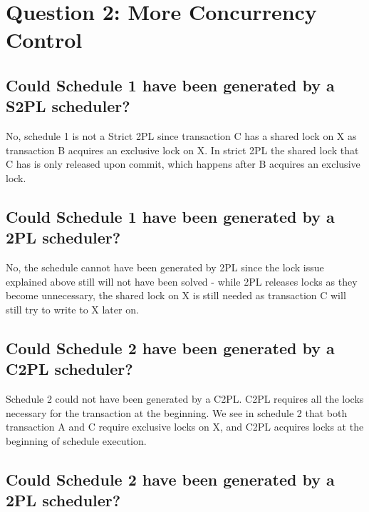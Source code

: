 \documentclass{article}
\begin{document}
\section{Question 2: More Concurrency Control}
\subsection{Could Schedule 1 have been generated by a S2PL scheduler?}
No, schedule 1 is not a Strict 2PL since transaction C has a shared lock on X as transaction B acquires an exclusive lock on X. In strict 2PL the shared lock that C has is only released upon commit, which happens after B acquires an exclusive lock.

\subsection{Could Schedule 1 have been generated by a 2PL scheduler?}

No, the schedule cannot have been generated by 2PL since the lock issue explained above still will not have been solved - while 2PL releases locks as they become unnecessary, the shared lock on X is still needed as transaction C will still try to write to X later on.


\subsection{Could Schedule 2 have been generated by a C2PL scheduler?}
Schedule 2 could not have been generated by a C2PL. C2PL requires all the locks necessary for the transaction at the beginning. We see in schedule 2 that both transaction A and C require exclusive locks on X, and C2PL acquires locks at the beginning of schedule execution.

\subsection{Could Schedule 2 have been generated by a 2PL scheduler?}
\end{document}
